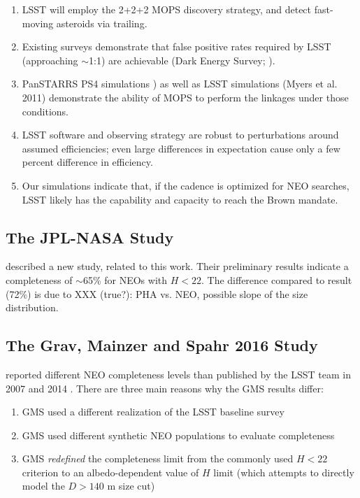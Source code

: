 \documentclass[12pt,preprint]{aastex}
\begin{document}
\begin{enumerate}
\item LSST will employ the 2+2+2 MOPS discovery strategy, and detect fast-moving asteroids via trailing.
\item Existing surveys demonstrate that false positive rates required
  by LSST (approaching $\sim$1:1) are  achievable (Dark Energy Survey;  \citep{goldstein2015}).
\item PanSTARRS PS4 simulations \citep{denneau13}) as well as LSST
  simulations (Myers et al. 2011) demonstrate the ability of MOPS to perform the linkages under those conditions.
\item LSST software and observing strategy are robust to perturbations
  around assumed efficiencies; even large differences in expectation
  cause only a few percent difference in efficiency. 
\item Our simulations indicate that, if the cadence is optimized for
          NEO searches, LSST likely has the capability and capacity to reach the Brown mandate.
\end{enumerate}




\subsection{The JPL-NASA Study}

\cite{JPLstudy} described a new study, related to this work. Their preliminary results indicate a completeness
of $\sim$65\% for NEOs with $H<22$. The difference compared to \cite{JJI2016} result (72\%) is due 
to XXX (true?): PHA vs. NEO, possible slope of the size distribution. 



\subsection{The Grav, Mainzer and Spahr 2016 Study \label{sec:GMS}}

\cite[hereafter GMS]{GMS2016} reported different NEO completeness levels than
published by the LSST team in 2007 and 2014 . There are three main 
reasons why the GMS results differ:
\begin{enumerate}
\item GMS used a different realization of the LSST baseline survey
\item GMS used different synthetic NEO populations to evaluate completeness
\item GMS {\it redefined} the completeness limit from the commonly
  used $H<22$ criterion to an albedo-dependent value of $H$ limit (which
  attempts to directly model the $D>140$ m size cut)
\end{enumerate}
\end{document}

